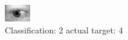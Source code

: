 \begin{figure}[h!]
\begin{center}
\includegraphics[width=0.60\columnwidth]{figures/ID855_class_2_target_4.png}
\end{center}
\caption{ Classification: 2 actual target: 4}
\label{fig:ID855_class_2_target_4}
\end{figure}
